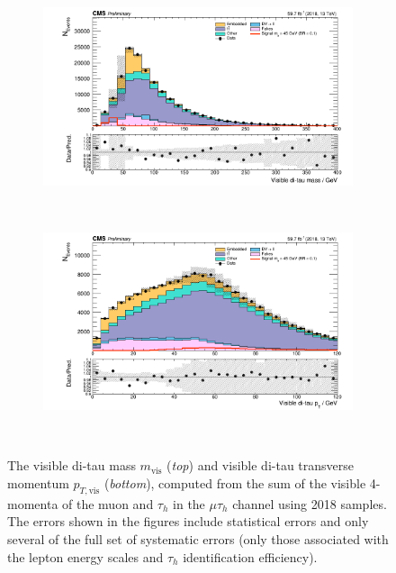 \begin{figure}[ht]
    \centering
    \begin{subfigure}{0.75\textwidth}
        \includegraphics[width=1.0\textwidth]{figures/ch-11-asymmetric/mutau_m_vis.png}
    \end{subfigure} \\
    \begin{subfigure}{0.75\textwidth}
        \includegraphics[width=1.0\textwidth]{figures/ch-11-asymmetric/mutau_pt_vis.png}
    \end{subfigure} \\   
    \caption{The visible di-tau mass $m_{\text{vis}}$ (\textit{top}) and visible di-tau transverse momentum $p_{T, \text{vis}}$ (\textit{bottom}), computed from the sum of the visible 4-momenta of the muon and $\tau_{h}$ in the $\mu\tau_{h}$ channel using 2018 samples. The errors shown in the figures include statistical errors and only several of the full set of systematic errors (only those associated with the lepton energy scales and $\tau_{h}$ identification efficiency).}
    \label{fig:nanoAOD_mutau_control_plots_mvis_ptvis}
\end{figure}


